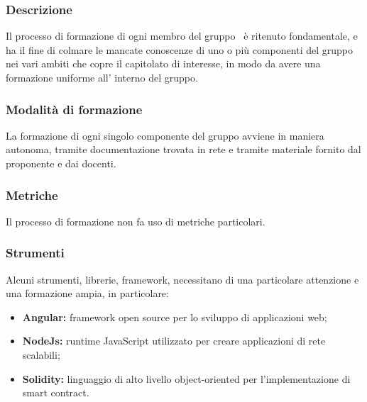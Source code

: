         \subsubsection {Descrizione}
        Il processo di formazione di ogni membro del gruppo \groupName\ è ritenuto fondamentale, e ha il fine di colmare le mancate conoscenze di uno o più componenti del gruppo nei vari ambiti che copre il capitolato di interesse, in modo da avere una formazione uniforme all' interno del gruppo.
        \subsubsection {Modalità di formazione}
        La formazione di ogni singolo componente del gruppo avviene in maniera autonoma, tramite documentazione trovata in rete e tramite materiale fornito dal proponente e dai docenti.
        \subsubsection {Metriche}
        Il processo di formazione non fa uso di metriche particolari.
        \subsubsection {Strumenti}
        Alcuni strumenti, librerie, framework, necessitano di una particolare attenzione e una formazione ampia, in particolare:
        \begin {itemize}
          \item \textbf{Angular:} framework open source per lo sviluppo di applicazioni web;
          \item \textbf{NodeJs: } runtime JavaScript utilizzato per creare applicazioni di rete scalabili;
          \item \textbf{Solidity: } linguaggio di alto livello object-oriented per l'implementazione di smart contract\glo.
        \end {itemize}